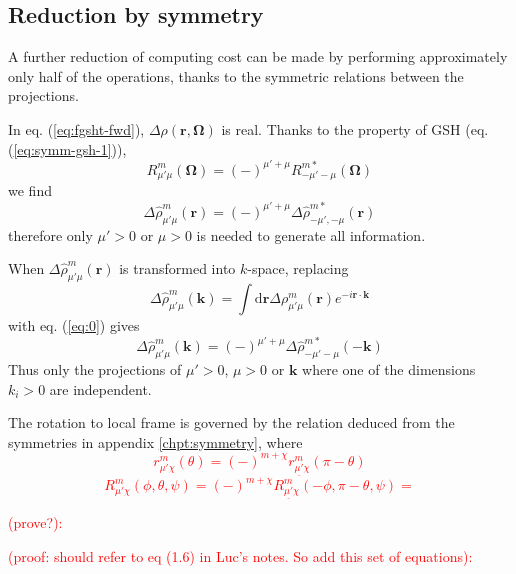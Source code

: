 \subsection{Reduction by symmetry\label{subsec:Reduction-by-symmetry}}

A further reduction of computing cost can be made by performing approximately
only half of the operations, thanks to the symmetric relations between
the projections.

In eq. (\ref{eq:fgsht-fwd}), $\Delta\rho(\mathbf{r},\mathbf{\Omega})$
is real. Thanks to the property of \acs{GSH} (eq. (\ref{eq:symm-gsh-1})),
\begin{equation}
R_{\mu'\mu}^{m}(\mathbf{\Omega})=(-)^{\mu'+\mu}R_{-\mu'-\mu}^{m*}(\mathbf{\Omega})
\end{equation}
we find
\begin{equation}
\Delta\hat{\rho}_{\mu'\mu}^{m}(\mathbf{r})=(-)^{\mu'+\mu}\Delta\hat{\rho}_{-\mu',-\mu}^{m*}(\mathbf{r})\label{eq:0}
\end{equation}
therefore only $\mu'>0$ or $\mu>0$ is needed to generate all information.

When $\Delta\hat{\rho}_{\mu'\mu}^{m}(\mathbf{r})$ is transformed
into $k$-space, replacing 
\begin{equation}
\Delta\hat{\rho}_{\mu'\mu}^{m}(\mathbf{k})=\int\mathrm{d}\mathbf{r}\Delta\rho_{\mu'\mu}^{m}(\mathbf{r})e^{-i\mathbf{r}\cdot\mathbf{k}}
\end{equation}
 with eq. (\ref{eq:0}) gives
\begin{equation}
\Delta\hat{\rho}_{\mu'\mu}^{m}(\mathbf{k})=(-)^{\mu'+\mu}\Delta\hat{\rho}_{-\mu'-\mu}^{m*}(-\mathbf{k})\label{eq:1}
\end{equation}
Thus only the projections of $\mu'>0$, $\mu>0$ or $\mathbf{k}$
where one of the dimensions $k_{i}>0$ are independent.

The rotation to local frame is governed by the relation deduced from
the symmetries in appendix \ref{chpt:symmetry}, where\textcolor{red}{
\begin{equation}
r_{\mu'\chi}^{m}(\theta)=(-)^{m+\chi}r_{\underline{\mu'}\chi}^{m}(\pi-\theta)
\end{equation}
\begin{equation}
R_{\mu'\chi}^{m}(\phi,\theta,\psi)=(-)^{m+\chi}R_{\underline{\mu'}\chi}^{m}(-\phi,\pi-\theta,\psi)=
\end{equation}
}

\textcolor{red}{(prove?): }

\textcolor{red}{(proof: should refer to eq (1.6) in Luc's notes. So
add this set of equations):}

